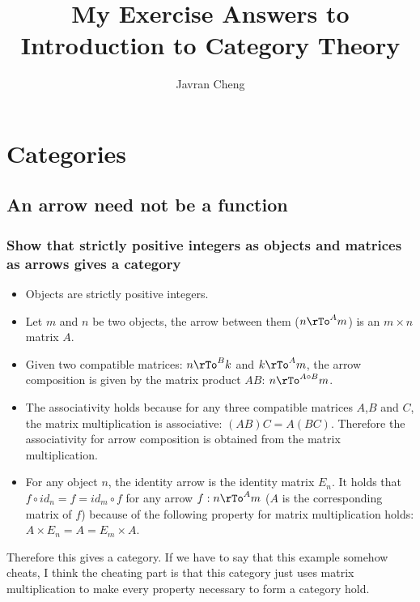 \documentclass[11pt]{article}
\title{My Exercise Answers to \\
Introduction to Category Theory}
\author{Javran Cheng}
\begin{document}
\maketitle

\newcommand{\cat}[1]{\textit{#1}}
\newcommand{\fcomp}{\circ}

\newcommand{\nat}{\mathbb{N}}

\section{Categories}




\subsection{An arrow need not be a function}

\subsubsection{Show that strictly positive integers as objects
and matrices as arrows gives a category}

\begin{itemize}
  \item Objects are strictly positive integers.
  \item Let $m$ and $n$ be two objects, the arrow between them
    ($n \rTo^A m$)
    is an $m \times n$ matrix $A$.
  \item Given two compatible matrices:
    $n \rTo^B k$ and $k \rTo^A m$,
    the arrow composition is given by the matrix product $AB$:
    $n \rTo^{A \fcomp B} m$.
  \item The associativity holds because for any three compatible matrices $A$,$B$ and $C$,
    the matrix multiplication is associative: $(AB)C = A(BC)$.
    Therefore the associativity for arrow composition is obtained from the matrix
    multiplication.
  \item For any object $n$, the identity arrow is the identity matrix $E_n$.
    It holds that $f \fcomp id_n = f = id_m \fcomp f$ for any arrow $f : n \rTo^A m$
    ($A$ is the corresponding matrix of $f$) because of the following property for
    matrix multiplication holds: $ A \times E_n = A = E_m \times A$.
\end{itemize}

Therefore this gives a category. If we have to say that this example somehow cheats,
I think the cheating part is that this category just uses matrix multiplication
to make every property necessary to form a category hold.
\end{document}
